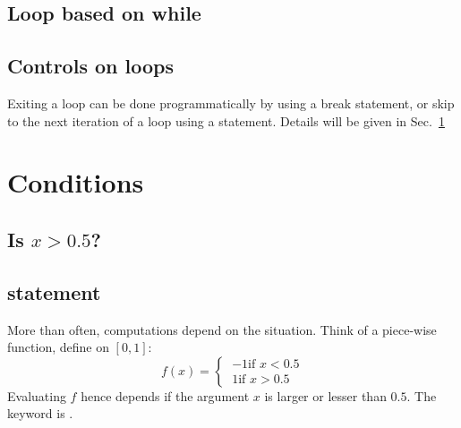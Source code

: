	\subsection{Loop based on while}
		
	\subsection{Controls on loops}
		Exiting a loop can be done programmatically by using a break statement, or skip to the next iteration of a loop using a  statement.  Details will be given in Sec.~\ref{sec-if}



\section{Conditions}\label{sec-if}
	\subsection{Is $x>0.5$?}

	\subsection{ statement}
	More than often, computations depend on the situation. 
	Think of a piece-wise function, define on $[0,1]$:
	$$f(x) = \left\{\
		\begin{array}{c}
			-1 \text{if } x<0.5\\
			 1 \text{if } x>0.5
		\end{array}
		\right.
	$$
	Evaluating $f$ hence depends if the argument $x$ is larger or lesser than $0.5$.
	The keyword is \mcode{if}.

